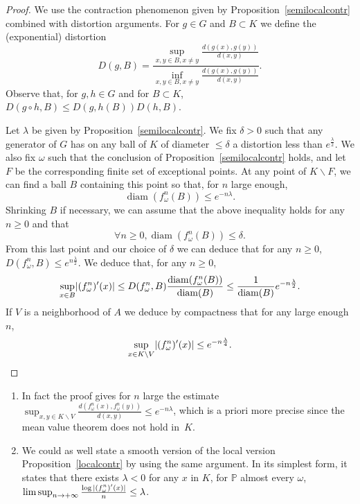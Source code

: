 \documentclass[AHL,Unicode,longabstracts,published]{cedram}
\DeclareMathOperator{\diam}{diam}
\newcommand{\bbP}{\mathbb{P}}
\renewcommand*{\to}{\mathchoice{\longrightarrow}{\rightarrow}{\rightarrow}{\rightarrow}}
\let\originalleft\left
\let\originalright\right
\renewcommand{\left}{\mathopen{}\mathclose\bgroup\originalleft}
\renewcommand{\right}{\aftergroup\egroup\originalright}
\let\oldforall\forall
\renewcommand*{\forall}{\mathrel{\oldforall}}
\begin{document}
\begin{proof}
We use the contraction phenomenon given by Proposition~\ref{semilocalcontr} combined with distortion arguments. For $g\in G$ and $B\subset K$ we define the (exponential) distortion
\[
D(g,B)=\frac{\sup_{x,y \in B, x\neq y} \frac{d(g(x),g(y))}{d(x,y)}}{\inf_{x,y \in B, x\neq y} \frac{d(g(x),g(y))}{d(x,y)}}.
\]
Observe that, for $g,h \in G$ and for $B \subset K$, $D(g\circ h,B) \leq D(g,h(B))D(h,B)$.


Let $\lambda$ be given by Proposition~\ref{semilocalcontr}. We fix $\delta>0$ such that any generator of $G$ has on any ball of $K$ of diameter $\leq \delta$ a distortion less than $e^{\frac{\lambda}{2}}$. We also fix $\omega$ such that the conclusion of Proposition~\ref{semilocalcontr} holds, and let $F$ be the corresponding finite set of exceptional points. At any point of $K\backslash F$, we can find a ball $B$ containing this point so that, for $n$ large enough,
\[
\diam(f_\omega^n(B))\leq e^{-n\lambda}.
\]
Shrinking $B$ if necessary, we can assume that the above inequality holds for any $n \geq 0$ and that
\[
\forall n\geq 0, \diam(f_\omega^n(B))\leq \delta.
\]
From this last point and our choice of $\delta$ we can deduce that for any $n\geq 0$, ${D(f_\omega^n,B)\leq e^{n\frac{\lambda}{2}}}$. We deduce that, for any $n\geq 0$,
\[
\sup_{x\in B} \left|(f_\omega^n)'(x)\right|\leq D(f_\omega^n,B) \frac{\diam(f_\omega^n(B))}{\diam(B)}\leq \frac{1}{\diam(B)} e^{-n\frac{\lambda}{2}}.
\]
If $V$ is a neighborhood of $A$ we deduce by compactness that for any large enough $n$,
\[
\sup_{x\in K\backslash V} \left|(f_\omega^n)'(x)\right|\leq e^{-n\frac{\lambda}{4}}.\qedhere
\]
\end{proof}

\begin{rema}\leavevmode
\label{diffremark}
\begin{enumerate}
\item In fact the proof gives for $n$ large the estimate $\sup_{x,y\in K\backslash V} \frac{d(f_\omega^n(x),f_\omega^n(y))}{d(x,y)}\leq e^{-n\lambda}$, which is a priori more precise since the mean value theorem does not hold in~$K$.
\item We could as well state a smooth version of the local version Proposition~\ref{localcontr} by using the same argument. In its simplest form, it states that there exists $\lambda<0$ for any $x$ in $K$, for $\bbP$ almost every $\omega$, $\limsup_{n\to +\infty} \frac{\log |(f_\omega^n)'(x)|}{n}\leq \lambda$.
\end{enumerate}
\end{rema}
\end{document}
